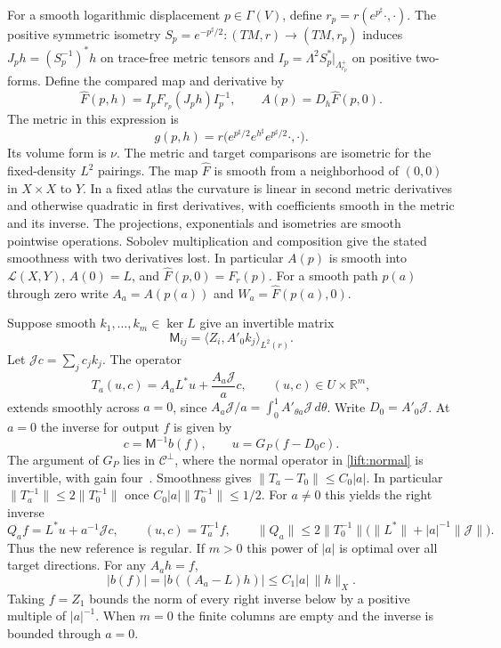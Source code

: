 \documentclass[11pt]{article}
\numberwithin{equation}{section}
\theoremstyle{definition}
\theoremstyle{remark}
\begin{document}
For a smooth logarithmic displacement \(p\in\Gamma(V)\), define
\(r_p=r(e^{p^\sharp}\cdot,\cdot)\). The positive symmetric
isometry \(S_p=e^{-p^\sharp/2}:(TM,r)\to(TM,r_p)\)
induces \(J_p h=(S_p^{-1})^*h\) on trace-free metric tensors
and \(I_p=\Lambda^2S_p^*|_{\Lambda^+_{r_p}}\) on positive two-forms.
Define the compared map and derivative by
\begin{equation}
 \widehat F(p,h)=I_pF_{r_p}(J_ph)I_p^{-1},
 \qquad A(p)=D_h\widehat F(p,0).
 \label{msreg:comparison}
\end{equation}
The metric in this expression is
\[
 g(p,h)=r\bigl(e^{p^\sharp/2}e^{h^\sharp}e^{p^\sharp/2}\cdot,\cdot\bigr).
\]
Its volume form is \(\nu\). The metric and target comparisons are
isometric for the fixed-density \(L^2\) pairings. The map
\(\widehat F\) is smooth from a neighborhood of \((0,0)\) in
\(X\times X\) to \(Y\). In a fixed atlas the curvature is linear in
second metric derivatives and otherwise quadratic in first
derivatives, with coefficients smooth in the metric and its inverse.
The projections, exponentials and isometries are smooth pointwise
operations. Sobolev multiplication and composition give the stated
smoothness with two derivatives lost. In particular \(A(p)\) is
smooth into \(\mathcal L(X,Y)\), \(A(0)=L\), and
\(\widehat F(p,0)=F_r(p)\). For a smooth path \(p(a)\) through zero
write \(A_a=A(p(a))\) and \(W_a=\widehat F(p(a),0)\).

Suppose smooth \(k_1,\ldots,k_m\in\ker L\) give an invertible matrix
\begin{equation}
 \mathsf M_{ij}=\langle Z_i,A'_0 k_j\rangle_{L^2(r)} .
 \label{msreg:mixedmatrix}
\end{equation}
Let \(\mathcal J c=\sum_j c_j k_j\). The operator
\begin{equation}
 T_a(u,c)=A_a L^*u+\frac{A_a\mathcal J}{a}c,
 \qquad (u,c)\in U\times\mathbb R^m ,
 \label{msreg:columns}
\end{equation}
extends smoothly across \(a=0\), since
\(A_a\mathcal J/a=\int_0^1 A'_{\theta a}\mathcal J\,d\theta\).
Write \(D_0=A'_0\mathcal J\). At \(a=0\) the inverse for output \(f\)
is given by
\[
 c=\mathsf M^{-1}b(f),\qquad u=G_P(f-D_0c).
\]
The argument of \(G_P\) lies in \(\mathcal C^\perp\), where the
normal operator in \eqref{lift:normal} is invertible, with gain
four~\cite[(1)--(2)]{Melrose2017Lecture22}. Smoothness gives
\(\|T_a-T_0\|\le C_0|a|\). In particular
\(\|T_a^{-1}\|\le2\|T_0^{-1}\|\) once
\(C_0|a|\|T_0^{-1}\|\le 1/2\). For \(a\ne0\) this yields the
right inverse
\begin{equation}
 Q_a f=L^*u+a^{-1}\mathcal J c,\qquad (u,c)=T_a^{-1}f,\qquad
 \|Q_a\|\le 2\|T_0^{-1}\|\bigl(\|L^*\|+|a|^{-1}\|\mathcal J\|\bigr).
 \label{msreg:inverse}
\end{equation}
Thus the new reference is regular. If \(m>0\) this power of
\(|a|\) is optimal over all target directions. For any \(A_a h=f\),
\begin{equation}
 |b(f)|=|b((A_a-L)h)|\le C_1|a|\,\|h\|_X.
 \label{msreg:lower}
\end{equation}
Taking \(f=Z_1\) bounds the norm of every right inverse below
by a positive multiple of \(|a|^{-1}\). When \(m=0\) the finite
columns are empty and the inverse is bounded through \(a=0\).
\end{document}
